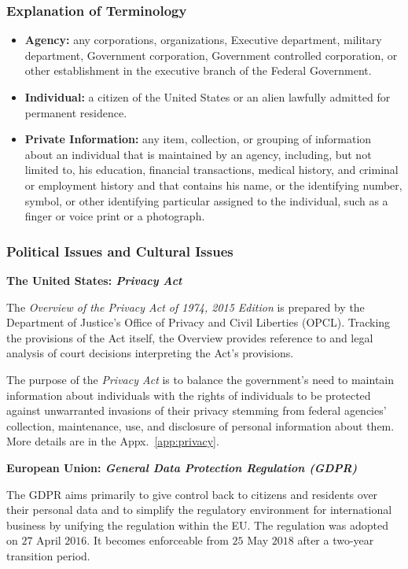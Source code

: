 \documentclass{mcmthesis}
\begin{document}
\subsubsection{Explanation of Terminology}
\begin{itemize}
\item \textbf{Agency:} any corporations, organizations, Executive department, military department, Government corporation, Government controlled corporation, or other establishment in the executive branch of the Federal Government.
\item \textbf{Individual:} a citizen of the United States or an alien lawfully admitted for permanent residence.
\item \textbf{Private Information:} any item, collection, or grouping of information about an individual that is maintained by an agency, including, but not limited to, his education, financial transactions, medical history, and criminal or employment history and that contains his name, or the identifying number, symbol, or other identifying particular assigned to the individual, such as a finger or voice print or a photograph.
\end{itemize}

\subsubsection{Political Issues and Cultural Issues}
\textbf{The United States: \emph{Privacy Act}} \cite{act1974privacy} 

The \emph{Overview of the Privacy Act of 1974, 2015 Edition} is prepared by the Department of Justice's Office of Privacy and Civil Liberties (OPCL). Tracking the provisions of the Act itself, the Overview provides reference to and legal analysis of court decisions interpreting the Act's provisions.

The purpose of the \emph{Privacy Act} is to balance the government's need to maintain information about individuals with the rights of individuals to be protected against unwarranted invasions of their privacy stemming from federal agencies' collection, maintenance, use, and disclosure of personal information about them. More details are in the Appx.~\ref{app:privacy}.

\textbf{European Union: \emph{General Data Protection Regulation (GDPR)} \cite{regulation2016regulation}  } 

The GDPR aims primarily to give control back to citizens and residents over their personal data and to simplify the regulatory environment for international business by unifying the regulation within the EU. The regulation was adopted on $27$ April $2016$. It becomes enforceable from $25$ May $2018$ after a two-year transition period.
\end{document}
